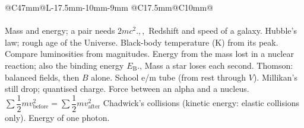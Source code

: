 {\small
\setlength\LTpre{3pt}\setlength\LTpost{4pt}
\renewcommand\arraystretch{1.05}
\begin{longtable}{@{}C{47mm}@{\hspace{3mm}}L{\dimexpr\linewidth-47mm-17.5mm-10mm-9mm\relax}%
    @{\hspace{3mm}}C{17.5mm}@{\hspace{3mm}}C{10mm}@{}}
  \fghead\\\hline\endfirsthead
  \fghead\\\hline\endhead
    {Mass and energy; a pair needs $2mc^2$.}{,\,,\,}
    {Redshift and speed of a galaxy.}{}
    {Hubble's law; rough age of the Universe.}{}
    {Black-body temperature (K) from its peak.}{}
    {Compare luminosities from magnitudes.}{}
    {Energy from the mass lost in a nuclear reaction; also the binding
     energy $E_\mathrm{B}$.}{, }
    {Mass a star loses each second.}{}
  \fgnext
    {Thomson: balanced fields, then $B$ alone.}{}
    {School e/m tube (from rest through $V$).}{}
    {Millikan's still drop; quantised charge.}{}
    {Force between an alpha and a nucleus.}{}
    {$\sum\dfrac{1}{2}mv^2_\mathrm{before} = \sum\dfrac{1}{2}mv^2_\mathrm{after}$}
    {Chadwick's collisions (kinetic energy: elastic collisions only).}
    {}
  \fgnext
    {Energy of one photon.}{}

\end{longtable}}
